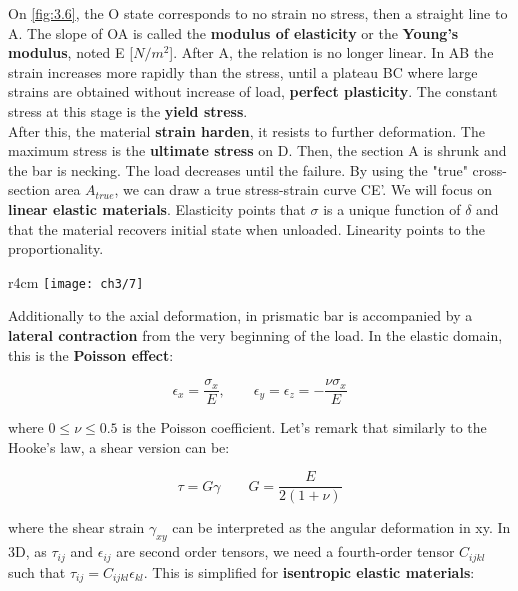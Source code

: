 			On \autoref{fig:3.6}, the O state corresponds to no strain no stress, then a straight line to A. The slope of OA is called the \textbf{modulus of elasticity} or the \textbf{Young's modulus}, noted E [$N/m^2$]. After A, the relation is no longer linear. In AB the strain increases more rapidly than the stress, until a plateau BC where large strains are obtained without increase of load, \textbf{perfect plasticity}. The constant stress at this stage is the \textbf{yield stress}. \\
			
			After this, the material \textbf{strain harden}, it resists to further deformation. The maximum stress is the \textbf{ultimate stress} on D. Then, the section A is shrunk and the bar is necking. The load decreases until the failure. By using the "true" cross-section area $A_{true}$, we can draw a true stress-strain curve CE'. We will focus on \textbf{linear elastic materials}. Elasticity points that $\sigma$ is a unique function of $\delta$ and that the material recovers initial state when unloaded. Linearity points to the proportionality. \\
			
			\begin{wrapfigure}[8]{r}{4cm}
			\vspace{-10mm}	
			\texttt{[image: ch3/7]}
			\label{fig:3.7}
			\end{wrapfigure}		
			Additionally to the axial deformation, in prismatic bar is accompanied by a \textbf{lateral contraction} from the very beginning of the load. In the elastic domain, this is the \textbf{Poisson effect}: 
			
			\begin{equation}
			\epsilon _x = \frac{\sigma _x}{E} , \qquad \epsilon _y = \epsilon _z = - \frac{\nu \sigma _x}{E}
			\end{equation}
			
			where $0\leq\nu\leq 0.5$ is the Poisson coefficient. Let's remark that similarly to the Hooke's law, a shear version can be:
			
			\begin{equation}
			\tau = G \gamma \qquad G =\frac{E}{2 (1+\nu )}
			\end{equation}
			
			where the shear strain $\gamma _{xy}$ can be interpreted as the angular deformation in xy. In 3D, as $\tau _{ij}$ and $\epsilon _{ij}$ are second order tensors, we need a fourth-order tensor $C_{ijkl}$ such that $\tau _{ij} = C_{ijkl} \epsilon _{kl}$. This is simplified for \textbf{isentropic elastic materials}:
			
